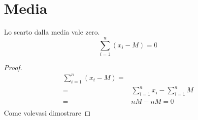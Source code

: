 \section{Media}
\begin{thm}
	Lo scarto dalla media vale zero.\[\sum_{i=1}^{n}(x_{i}-M)=0\] 
\end{thm}
\begin{proof}
	\begin{align*}
	\sum_{i=1}^{n}(x_{i}-M)=&\\
	=&\sum_{i=1}^{n}x_{i}-\sum_{i=1}^{n}M\\
	=&nM-nM=0\\
	\end{align*}
	Come volevasi dimostrare
\end{proof}